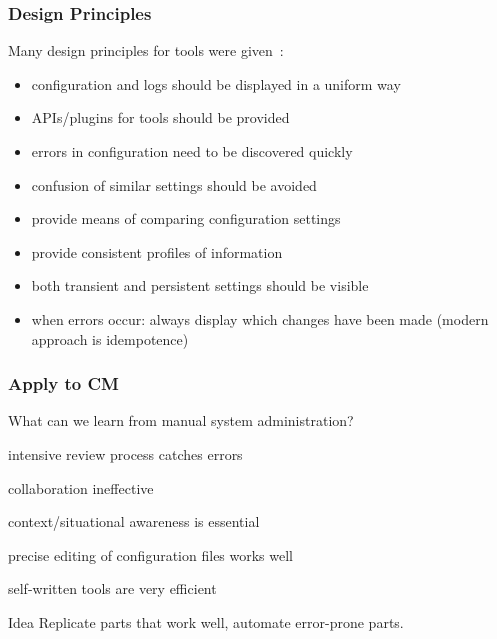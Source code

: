 \begin{frame}
	\frametitle{Design Principles \cite{haber2007design}}

	Many design principles for tools were given~\cite{haber2007design}:

	\begin{itemize}[<+-| alert@+>]
	\item configuration and logs should be displayed in a uniform way
	\item APIs/plugins for tools should be provided
	\item errors in configuration need to be discovered quickly
	\item confusion of similar settings should be avoided
	\item provide means of comparing configuration settings
	\item provide consistent profiles of information
	\item both transient and persistent settings should be visible
	\item when errors occur: always display which changes have been made (modern approach is idempotence)
	\end{itemize}
\end{frame}

\begin{frame}
	\frametitle{Apply to CM}

	What can we learn from manual system administration?

	\begin{description}[<+-| alert@+>] %
	\item[$+$] intensive review process catches errors
	\item[$-$] collaboration ineffective
	\item[$-$] context/situational awareness is essential
	\item[$+$] precise editing of configuration files works well
	\item[$+$] self-written tools are very efficient
	\end{description}

	\pause[\thebeamerpauses]  %

	\begin{alertblock}{Idea}
	Replicate parts that work well, automate error-prone parts.
	\end{alertblock}
\end{frame}

